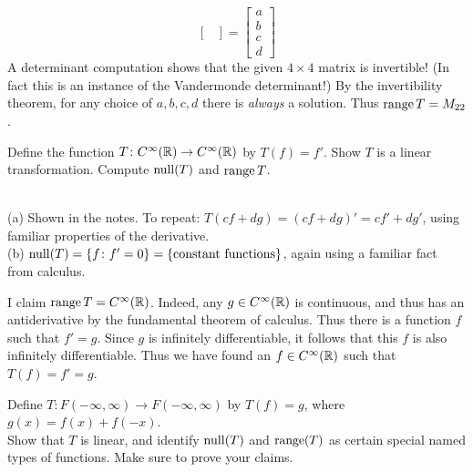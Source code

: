 \begin{solution}
\[\begin{bmatrix}
\end{bmatrix}
=\begin{bmatrix}
a\\b\\c\\d
\end{bmatrix}
\]
A determinant computation shows that the given $4\times 4$ matrix is invertible! (In fact this is an instance of the Vandermonde determinant!) By the invertibility theorem, for any choice of $a,b,c,d$ there is {\em always} a solution. Thus $\operatorname{range} T=M_{22}$. 
\end{solution}
\ii Define the function $T\colon C^\infty({\mathbb R})\rightarrow C^\infty({\mathbb R})$ by $T(f)=f'$.
\bb
\ii Show $T$ is a linear transformation. 
\ii Compute $\operatorname{null}(T)$ and $\operatorname{range} T$. 
\ee
\begin{solution}
\ \\ (a) Shown in the notes. To repeat: $T(cf+dg)=(cf+dg)'=cf'+dg'$, using familiar properties of the derivative.  
\\
(b) $\operatorname{null}(T)=\{f\colon f'=0\}=\{\text{constant functions}\}$, again using a familiar fact from calculus. 

\noindent 
I claim $\operatorname{range} T=C^\infty({\mathbb R})$. Indeed, any $g\in C^\infty({\mathbb R})$ is continuous, and thus has an antiderivative by the fundamental theorem of calculus. Thus there is a function $f$ such that $f'=g$. Since $g$ is infinitely differentiable, it follows that this $f$ is also infinitely differentiable. Thus we have found an $f\in C^\infty({\mathbb R})$ such that $T(f)=f'=g$. 
\end{solution}
\ii Define $T\colon F(-\infty,\infty)\rightarrow F(-\infty, \infty)$ by $T(f)=g$, where $g(x)=f(x)+f(-x)$. 
\\
Show that $T$ is linear, and identify $\operatorname{null}(T)$ and $\operatorname{range}(T)$ as certain special named types of functions. Make sure to prove your claims. 
\\
